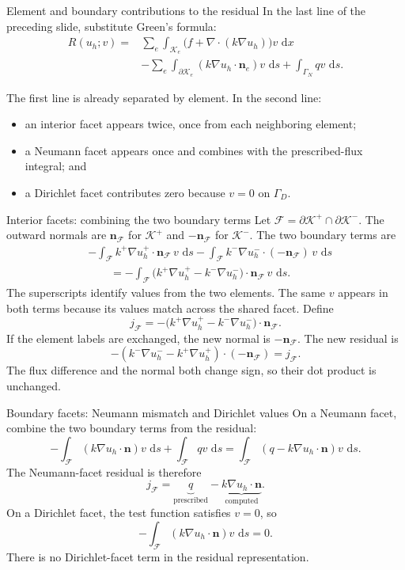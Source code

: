 \documentclass[11pt,aspectratio=169]{beamer}
\newcommand{\dd}{\,\mathrm{d}}
\newcommand{\GamD}{\Gamma_D}
\newcommand{\GamN}{\Gamma_N}
\newcommand{\grad}{\nabla}
\newcommand{\divg}{\nabla\!\cdot}
\newcommand{\bn}{\bm n}
\begin{document}
\begin{frame}{Element and boundary contributions to the residual}
In the last line of the preceding slide, substitute Green's formula:
\[
\begin{aligned}
R(u_h;v)={}&
\sum_e\int_{\mathcal K_e}
\bigl(f+\divg(k\grad u_h)\bigr)v\,\dd x\\
&-\sum_e\int_{\partial\mathcal K_e}
(k\grad u_h\cdot\bn_e)v\,\dd s
+\int_{\GamN}qv\,\dd s.
\end{aligned}
\]

The first line is already separated by element. In the second line:
\begin{itemize}
  \item an interior facet appears twice, once from each neighboring element;
  \item a Neumann facet appears once and combines with the prescribed-flux
  integral; and
  \item a Dirichlet facet contributes zero because $v=0$ on $\GamD$.
\end{itemize}
\end{frame}

\begin{frame}{Interior facets: combining the two boundary terms}
Let $\mathcal F=\partial\mathcal K^+\cap\partial\mathcal K^-$. The outward
normals are $\bn_{\mathcal F}$ for $\mathcal K^+$ and
$-\bn_{\mathcal F}$ for $\mathcal K^-$. The two boundary terms are
\[
\begin{aligned}
&-\int_{\mathcal F}
  k^+\grad u_h^+\cdot\bn_{\mathcal F}\,v\,\dd s
-\int_{\mathcal F}
  k^-\grad u_h^-\cdot(-\bn_{\mathcal F})\,v\,\dd s\\
&\qquad=-\int_{\mathcal F}
  \bigl(k^+\grad u_h^+-k^-\grad u_h^-\bigr)
  \cdot\bn_{\mathcal F}\,v\,\dd s.
\end{aligned}
\]
The superscripts identify values from the two elements. The same $v$ appears
in both terms because its values match across the shared facet. Define
\[
  j_{\mathcal F}
  =-\bigl(k^+\grad u_h^+-k^-\grad u_h^-\bigr)\cdot\bn_{\mathcal F}.
\]
If the element labels are exchanged, the new normal is
$-\bn_{\mathcal F}$. The new residual is
\[
 -(k^-\grad u_h^--k^+\grad u_h^+)\cdot(-\bn_{\mathcal F})
 =j_{\mathcal F}.
\]
The flux difference and the normal both change sign, so their dot product
is unchanged.
\end{frame}

\begin{frame}{Boundary facets: Neumann mismatch and Dirichlet values}
On a Neumann facet, combine the two boundary terms from the residual:
\[
 -\int_{\mathcal F}(k\grad u_h\cdot\bn)v\,\dd s
 +\int_{\mathcal F}qv\,\dd s
 =\int_{\mathcal F}(q-k\grad u_h\cdot\bn)v\,\dd s.
\]
The Neumann-facet residual is therefore
\[
  j_{\mathcal F}
  =\underbrace{q}_{\text{prescribed}}
   -\underbrace{k\grad u_h\cdot\bn}_{\text{computed}}.
\]
On a Dirichlet facet, the test function satisfies $v=0$, so
\[
 -\int_{\mathcal F}(k\grad u_h\cdot\bn)v\,\dd s=0.
\]
There is no Dirichlet-facet term in the residual representation.
\end{frame}
\end{document}

